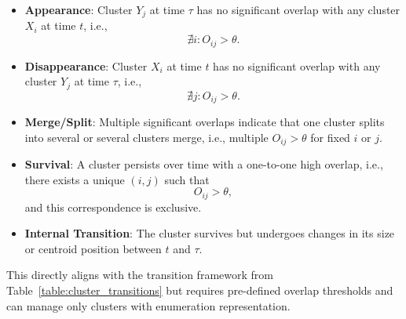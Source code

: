 \begin{itemize}
    \item \textbf{Appearance}: Cluster $ Y_j $ at time $ \tau $ has no significant overlap with any cluster $ X_i $ at time $ t $, i.e.,
          \[
              \nexists i: O_{ij} > \theta.
          \]

    \item \textbf{Disappearance}: Cluster $ X_i $ at time $ t $ has no significant overlap with any cluster $ Y_j $ at time $ \tau $, i.e.,
          \[
              \nexists j: O_{ij} > \theta.
          \]

    \item \textbf{Merge/Split}: Multiple significant overlaps indicate that one cluster splits into several or several clusters merge, i.e., multiple $ O_{ij} > \theta $ for fixed $ i $ or $ j $.

    \item \textbf{Survival}: A cluster persists over time with a one-to-one high overlap, i.e., there exists a unique $ (i,j) $ such that
          \[
              O_{ij} > \theta,
          \]
          and this correspondence is exclusive.

    \item \textbf{Internal Transition}: The cluster survives but undergoes changes in its size or centroid position between $ t $ and $ \tau $.
\end{itemize}

This directly aligns with the transition framework from
Table~\ref{table:cluster_transitions} but requires pre-defined overlap
thresholds and can manage only clusters with enumeration representation.


